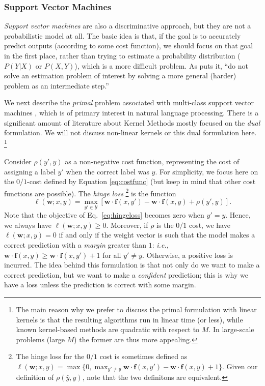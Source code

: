 \subsubsection{Support Vector Machines}\label{sec:svms}

\textit{Support vector machines} are also a discriminative approach, but they are not a probabilistic model at all. 
The basic idea is that, if the goal is to accurately predict outputs (according to some cost function), we should focus on that 
goal in the first place, rather than trying to estimate a probability distribution ($P(Y|X)$ or $P(X,Y)$), 
which is a more difficult problem. As \citet{Vapnik1995} puts it, 
``do not solve an estimation problem of interest by solving a more general (harder) problem as an intermediate step.''  

We next describe the \emph{primal} problem associated with multi-class support vector machines \citep{Crammer2002}, 
which is of primary interest in natural language processing. 
There is a significant amount of literature about Kernel Methods \citep{Schoelkopf2002,ShaweTaylor2004} mostly focused 
on the \emph{dual} formulation. We will not discuss non-linear kernels or this dual formulation here.%
\footnote{The main reason why we prefer to discuss the primal formulation with linear kernels is that 
the resulting algorithms run in linear time (or less), while known kernel-based methods are quadratic with 
respect to $M$. In large-scale problems (large $M$) the former are thus more appealing.}

Consider $\rho(y',y)$ as a non-negative cost function, representing the cost of assigning a label $y'$ when the correct label was $y$. For simplicity, we focus here on the $0/1$-cost defined by Equation \ref{eq:costfunc} (but keep in mind that other cost functions are possible).  
The \emph{hinge loss}%
\footnote{The hinge loss for the $0/1$ cost is sometimes defined as 
$\ell(\boldsymbol{w}; x,y) = \max\{0, \max_{y' \ne y} \boldsymbol{w} \cdot \boldsymbol{f}(x,y') - \boldsymbol{w} \cdot\boldsymbol{f}(x,y) + 1\}$.
Given our definition of $\rho(\hat{y},y)$, note that the  two definitons are equivalent.} %
 is the function
\begin{equation}\label{eq:hingeloss}
\ell(\boldsymbol{w}; x,y) = \max_{y' \in \mathcal{Y}} \left[\boldsymbol{w} \cdot \boldsymbol{f}(x,y') - \boldsymbol{w} \cdot\boldsymbol{f}(x,y) + \rho(y',y)\right].
\end{equation}
Note that the objective of Eq.~\ref{eq:hingeloss} becomes zero when $y'=y$. Hence, we always have $\ell(\boldsymbol{w}; x,y)\ge 0$. 
Moreover, if $\rho$ is the $0/1$ cost, we have $\ell(\boldsymbol{w}; x,y)= 0$ if and only if the weight vector is such that the model makes a correct prediction 
with a \emph{margin} greater than $1$: \emph{i.e.}, $\boldsymbol{w} \cdot \boldsymbol{f}(x,y) \ge \boldsymbol{w} \cdot\boldsymbol{f}(x,y') + 1$ for all $y' \ne y$. 
Otherwise, a positive loss is incurred. The idea behind this formulation is that not only do we want to make a correct prediction, but we want to make a \emph{confident} prediction; this is why we have a loss unless the prediction is correct with some margin.

